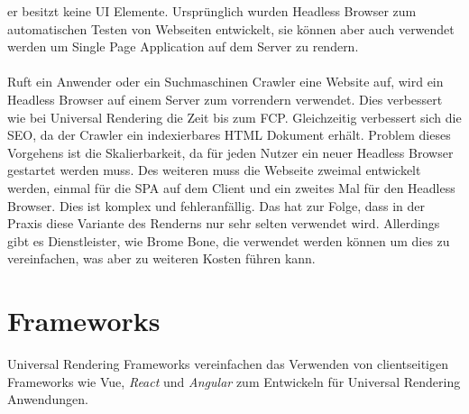 \documentclass[runningheads]{llncs}
\begin{document}
er besitzt keine UI Elemente. 
Ursprünglich wurden Headless Browser zum automatischen Testen von Webseiten entwickelt, 
sie können aber auch verwendet werden um Single Page Application auf dem Server zu rendern. 
\\
\\
Ruft ein Anwender oder ein Suchmaschinen Crawler eine Website auf, 
wird ein Headless Browser auf einem Server zum vorrendern verwendet. 
Dies verbessert wie bei Universal Rendering die Zeit bis zum FCP. Gleichzeitig verbessert sich die SEO, da der Crawler ein indexierbares HTML Dokument erhält. 
Problem dieses Vorgehens ist die Skalierbarkeit, 
da für jeden Nutzer ein neuer Headless Browser gestartet werden muss. 
Des weiteren muss die Webseite zweimal entwickelt werden, 
einmal für die SPA auf dem Client und ein zweites Mal für den Headless Browser. 
Dies ist komplex und fehleranfällig. Das hat zur Folge, 
dass in der Praxis diese Variante des Renderns nur sehr selten verwendet wird. 
Allerdings gibt es Dienstleister, wie Brome Bone, 
die verwendet werden können um dies zu vereinfachen, 
was aber zu weiteren Kosten führen kann.

\newpage

\section{Frameworks}
\label{sec:Evaluation}
Universal Rendering Frameworks vereinfachen das Verwenden von clientseitigen Frameworks wie Vue, 
\textit{React} und \textit{Angular} zum Entwickeln für Universal Rendering Anwendungen. 
\end{document}
